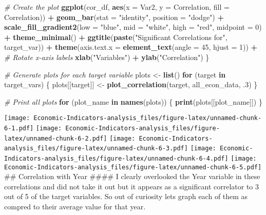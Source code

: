 \documentclass[
]{article}
\newenvironment{Shaded}{\begin{snugshade}}{\end{snugshade}}
\newcommand{\AttributeTok}[1]{\textcolor[rgb]{0.13,0.29,0.53}{#1}}
\newcommand{\CommentTok}[1]{\textcolor[rgb]{0.56,0.35,0.01}{\textit{#1}}}
\newcommand{\ControlFlowTok}[1]{\textcolor[rgb]{0.13,0.29,0.53}{\textbf{#1}}}
\newcommand{\DecValTok}[1]{\textcolor[rgb]{0.00,0.00,0.81}{#1}}
\newcommand{\FunctionTok}[1]{\textcolor[rgb]{0.13,0.29,0.53}{\textbf{#1}}}
\newcommand{\NormalTok}[1]{#1}
\newcommand{\OtherTok}[1]{\textcolor[rgb]{0.56,0.35,0.01}{#1}}
\newcommand{\SpecialCharTok}[1]{\textcolor[rgb]{0.81,0.36,0.00}{\textbf{#1}}}
\newcommand{\StringTok}[1]{\textcolor[rgb]{0.31,0.60,0.02}{#1}}
\begin{document}
\begin{Shaded}
\begin{Highlighting}[]
  \CommentTok{\# Create the plot}
  \FunctionTok{ggplot}\NormalTok{(cor\_df, }\FunctionTok{aes}\NormalTok{(}\AttributeTok{x =}\NormalTok{ Var2, }\AttributeTok{y =}\NormalTok{ Correlation, }\AttributeTok{fill =}\NormalTok{ Correlation)) }\SpecialCharTok{+}
    \FunctionTok{geom\_bar}\NormalTok{(}\AttributeTok{stat =} \StringTok{"identity"}\NormalTok{, }\AttributeTok{position =} \StringTok{"dodge"}\NormalTok{) }\SpecialCharTok{+}
    \FunctionTok{scale\_fill\_gradient2}\NormalTok{(}\AttributeTok{low =} \StringTok{"blue"}\NormalTok{, }\AttributeTok{mid =} \StringTok{"white"}\NormalTok{, }\AttributeTok{high =} \StringTok{"red"}\NormalTok{, }\AttributeTok{midpoint =} \DecValTok{0}\NormalTok{) }\SpecialCharTok{+}
    \FunctionTok{theme\_minimal}\NormalTok{() }\SpecialCharTok{+}
    \FunctionTok{ggtitle}\NormalTok{(}\FunctionTok{paste}\NormalTok{(}\StringTok{"Significant Correlations for"}\NormalTok{, target\_var)) }\SpecialCharTok{+}
    \FunctionTok{theme}\NormalTok{(}\AttributeTok{axis.text.x =} \FunctionTok{element\_text}\NormalTok{(}\AttributeTok{angle =} \DecValTok{45}\NormalTok{, }\AttributeTok{hjust =} \DecValTok{1}\NormalTok{)) }\SpecialCharTok{+} \CommentTok{\# Rotate x{-}axis labels}
    \FunctionTok{xlab}\NormalTok{(}\StringTok{"Variables"}\NormalTok{) }\SpecialCharTok{+}
    \FunctionTok{ylab}\NormalTok{(}\StringTok{"Correlation"}\NormalTok{)}
\NormalTok{\}}

\CommentTok{\# Generate plots for each target variable}
\NormalTok{plots }\OtherTok{\textless{}{-}} \FunctionTok{list}\NormalTok{()}
\ControlFlowTok{for}\NormalTok{ (target }\ControlFlowTok{in}\NormalTok{ target\_vars) \{}
\NormalTok{  plots[[target]] }\OtherTok{\textless{}{-}} \FunctionTok{plot\_correlation}\NormalTok{(target, all\_econ\_data, .}\DecValTok{3}\NormalTok{)}
\NormalTok{\}}

\CommentTok{\# Print all plots}
\ControlFlowTok{for}\NormalTok{ (plot\_name }\ControlFlowTok{in} \FunctionTok{names}\NormalTok{(plots)) \{}
  \FunctionTok{print}\NormalTok{(plots[[plot\_name]])}
\NormalTok{\}}
\end{Highlighting}
\end{Shaded}

\texttt{[image: Economic-Indicators-analysis\_files/figure-latex/unnamed-chunk-6-1.pdf]}
\texttt{[image: Economic-Indicators-analysis\_files/figure-latex/unnamed-chunk-6-2.pdf]}
\texttt{[image: Economic-Indicators-analysis\_files/figure-latex/unnamed-chunk-6-3.pdf]}
\texttt{[image: Economic-Indicators-analysis\_files/figure-latex/unnamed-chunk-6-4.pdf]}
\texttt{[image: Economic-Indicators-analysis\_files/figure-latex/unnamed-chunk-6-5.pdf]}
\#\# Correlation with Year \#\#\#\# I clearly overlooked the Year
variable in these correlations and did not take it out but it appears as
a significant correlator to 3 out of 5 of the target variables. So out
of curiosity lets graph each of them as compred to their average value
for that year.
\end{document}
